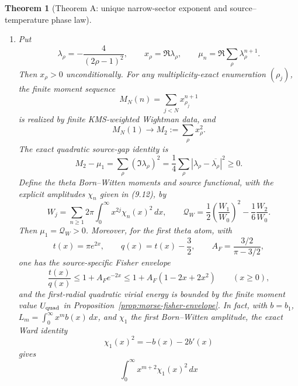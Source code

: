 \documentclass[11pt]{article}
\newtheorem{theorem}{Theorem}[section]
\begin{document}
\begin{theorem}[Theorem A: unique narrow-sector exponent and source--temperature phase law]
\begin{enumerate}[label=\textup{(\roman*)}]
\[\begin{aligned}
 &\Longleftrightarrow
 \Re\rho\le\tfrac12+\alpha
 \quad\text{for every xi zero }\rho.
 \end{aligned}
 \tag{1.7}
\]
If
\[
 H=\sum_\rho|r_\rho|^2,\qquad
 E=\sum_\rho|r_\rho-r_{\rho^\dagger}|^2,
 \qquad C=\Re\!\left(-\frac{(\Xi_C'/\Xi_C)(i/2)}{i/2}\right),
 \tag{1.8}
\]
then
\[
 C=2+\gamma_{\!E}-\log(4\pi),\qquad 0<C<\tfrac12,
 \qquad E=2(H-C).
 \tag{1.9}
\]
The function
\[
 \mathcal B_C(\alpha)=
 \frac{4\alpha^2C}{C^{-1}-3/4-\alpha^2}
 \tag{1.10}
\]
is strictly increasing on $[0,\frac12]$ and satisfies
\[
 E\le\mathcal B_C(\alpha)\quad\text{whenever }R_P\le\alpha,
 \qquad E\le\mathcal B_C(R_P).
 \tag{1.11}
\]
In particular,
\[
 E<\mathcal B_C(\tfrac12)=\frac{C^2}{1-C}<C,
 \qquad C\le H<\frac{2-C}{2(1-C)}C<\frac32C.
 \tag{1.12}
\]
Moreover,
\[
 r_{\rho^\dagger}=-\sum_{m\ge1}\overline{r_\rho}^{\,m},\qquad
 -\frac{(\Xi_C'/\Xi_C)(i/2)}{i/2}
   =-\sum_{m\ge0}\sum_\rho r_\rho^{m+2},
 \tag{1.13}
\]
with pointwise and absolute double-series convergence, respectively.
\item Put
\[
 \lambda_\rho=-\frac4{(2\rho-1)^2},\qquad
 x_\rho=\Re\lambda_\rho,\qquad
 \mu_n=\Re\sum_\rho\lambda_\rho^{n+1}.
 \tag{1.14}
\]
Then $x_\rho>0$ unconditionally.  For any multiplicity-exact enumeration $(\rho_j)$, the finite
moment sequence
\[
 M_N(n)=\sum_{j<N}x_{\rho_j}^{n+1}
 \tag{1.15}
\]
is realized by finite KMS-weighted Wightman data, and
\[
 M_N(1)\longrightarrow M_2:=\sum_\rho x_\rho^2.
 \tag{1.16}
\]
The exact quadratic source-gap identity is
\[
 M_2-\mu_1
 =\sum_\rho(\Im\lambda_\rho)^2
 =\frac14\sum_\rho|\lambda_\rho-\overline{\lambda_\rho}|^2
 \ge0.
 \tag{1.17}
\]
Define the theta Born--Witten moments and source functional, with the explicit amplitudes
$\chi_n$ given in \textup{(9.12)}, by
\[
 W_j=\sum_{n\ge1}2\pi\int_0^\infty x^{2j}\chi_n(x)^2\,dx,
 \qquad
 \mathcal Q_W=\frac12\left(\frac{W_1}{W_0}\right)^2
              -\frac16\frac{W_2}{W_0}.
 \tag{1.18}
\]
Then $\mu_1=\mathcal Q_W>0$.  Moreover,
for the first theta atom, with
\[
 t(x)=\pi e^{2x},\qquad q(x)=t(x)-\frac32,
 \qquad A_F=\frac{3/2}{\pi-3/2},
\]
one has the source-specific Fisher envelope
\[
 \frac{t(x)}{q(x)}
 \le 1+A_Fe^{-2x}
 \le 1+A_F(1-2x+2x^2)\qquad(x\ge0),
 \tag{1.18a}
\]
and the first-radial quadratic virial energy is bounded by the finite moment value
$U_{\rm quad}$ in Proposition~\ref{prop:morse-fisher-envelope}.  In fact, with
$b=b_1$, $L_m=\int_0^\infty x^m b(x)\,dx$, and $\chi_1$ the first Born--Witten amplitude,
the exact Ward identity
\[
 \chi_1(x)^2=-b(x)-2b'(x)
 \tag{1.18b}
\]
gives
\[
 \int_0^\infty x^{m+2}\chi_1(x)^2\,dx
\]
\end{enumerate}
\end{theorem}
\end{document}
